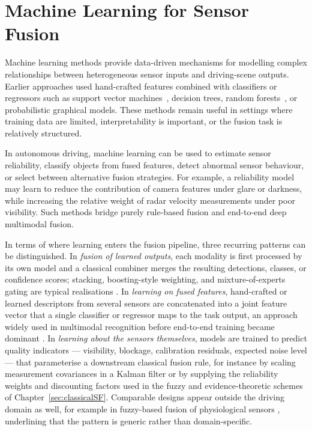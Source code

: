 \section{Machine Learning for Sensor Fusion}
%
Machine learning methods provide data-driven mechanisms for modelling complex relationships between heterogeneous sensor inputs and driving-scene outputs. Earlier approaches used hand-crafted features combined with classifiers or regressors such as support vector machines~\cite{cortes1995_svm}, decision trees, random forests~\cite{breiman2001_rf}, or probabilistic graphical models. These methods remain useful in settings where training data are limited, interpretability is important, or the fusion task is relatively structured.

In autonomous driving, machine learning can be used to estimate sensor reliability, classify objects from fused features, detect abnormal sensor behaviour, or select between alternative fusion strategies. For example, a reliability model may learn to reduce the contribution of camera features under glare or darkness, while increasing the relative weight of radar velocity measurements under poor visibility. Such methods bridge purely rule-based fusion and end-to-end deep multimodal fusion.

In terms of where learning enters the fusion pipeline, three recurring patterns can be distinguished. In \emph{fusion of learned outputs}, each modality is first processed by its own model and a classical combiner merges the resulting detections, classes, or confidence scores; stacking, boosting-style weighting, and mixture-of-experts gating are typical realisations \cite{breiman2001_rf,khaleghi_multisensor_2013}. In \emph{learning on fused features}, hand-crafted or learned descriptors from several sensors are concatenated into a joint feature vector that a single classifier or regressor maps to the task output, an approach widely used in multimodal recognition before end-to-end training became dominant \cite{atrey_multimodal_2010,gao_survey_2020}. In \emph{learning about the sensors themselves}, models are trained to predict quality indicators --- visibility, blockage, calibration residuals, expected noise level --- that parameterise a downstream classical fusion rule, for instance by scaling measurement covariances in a Kalman filter or by supplying the reliability weights and discounting factors used in the fuzzy and evidence-theoretic schemes of Chapter~\ref{sec:classicalSF}. Comparable designs appear outside the driving domain as well, for example in fuzzy-based fusion of physiological sensors \cite{testa_fuzzyfusion_2025}, underlining that the pattern is generic rather than domain-specific.

